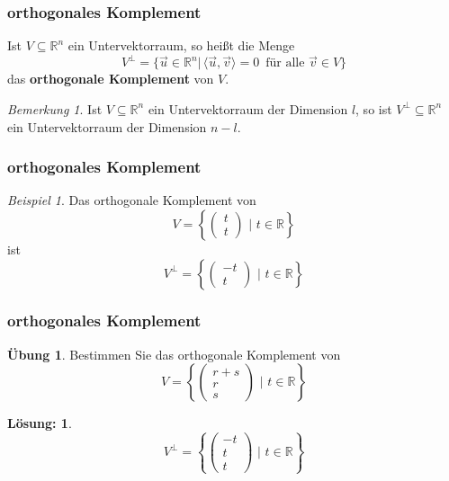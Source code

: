 \documentclass[hyperref={pdfpagelabels=false}]{beamer}
\theoremstyle{plain}%
\theoremstyle{definition}
\newtheorem*{uebung}{Übung}
\newtheorem*{sol}{Lösung:}
\theoremstyle{remark}
\newtheorem*{beispiel}{Beispiel}
\newtheorem*{notiz}{Bemerkung}
\def \R{\mathbb R}
\newcommand{\vektor}[1]{\overrightarrow{#1}}
\begin{document}
\begin{frame}
\frametitle{orthogonales Komplement}

\begin{definition} 
Ist $V \subseteq \mathbb R^n$ ein Untervektorraum, so heißt die Menge
  	$$ V^{\perp} = \{ \vektor{u} \in \mathbb R^n \vert \, 
      \langle \vektor{u}, \vektor{v}  \rangle =  0 \, \textrm{ für alle } 
      \vektor{v} \in V \} $$
das \textbf{orthogonale Komplement} von $V$.
\end{definition}

\pause 
\begin{notiz} Ist $V \subseteq \mathbb R^n$ ein Untervektorraum der 
Dimension $l$, so ist $V^{\perp} \subseteq \mathbb R^n$ ein Untervektorraum der Dimension $n-l$.
\end{notiz}

\end{frame}

\begin{frame}
\frametitle{orthogonales Komplement}

\begin{beispiel}
Das orthogonale Komplement von 
 	$$ V = \left\{ \left( \begin{matrix} t \\ t \end{matrix} \right) \,\, \vert \,\, t \in \R \right\} $$
ist
	$$ V^{\perp} = \left\{ \left( \begin{matrix} -t \\ t \end{matrix} \right) \,\, \vert \,\, t \in \R \right\} $$

\end{beispiel}

\end{frame}

\begin{frame}
\frametitle{orthogonales Komplement}

\begin{uebung}
Bestimmen Sie das  orthogonale Komplement von 
 	$$ V = \left\{ \left( \begin{matrix} r+s \\ r \\ s  \end{matrix} \right) \,\, \vert \,\, t \in \R \right\} $$
\end{uebung}

\bigbreak
\pause \pause 
\begin{sol}
	$$ V^{\perp} = \left\{ \left( \begin{matrix} -t \\ t \\ t \end{matrix} \right) \,\, \vert \,\, t \in \R \right\} $$

\end{sol}
\end{frame}
\end{document}

